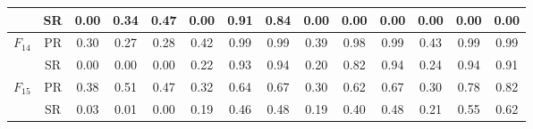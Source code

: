 \begin{table*}[h]
\begin{tabular}{|c|c|ccc|ccc|ccc|ccc|}
    & SR & 0.00 & 0.34 & 0.47 & 0.00 & 0.91 & 0.84 & 0.00 & 0.00 & 0.00 & 0.00 & 0.00 & 0.00 \\
    \hline
    \multirow{2}{*}{$F_{14}$} & PR & 0.30 & 0.27 & 0.28 & 0.42 & 0.99 & 0.99 & 0.39 & 0.98 & 0.99 & 0.43 & 0.99 & 0.99 \\
    & SR & 0.00 & 0.00 & 0.00 & 0.22 & 0.93 & 0.94 & 0.20 & 0.82 & 0.94 & 0.24 & 0.94 & 0.91 \\
    \hline
    \multirow{2}{*}{$F_{15}$} & PR & 0.38 & 0.51 & 0.47 & 0.32 & 0.64 & 0.67 & 0.30 & 0.62 & 0.67 & 0.30 & 0.78 & 0.82 \\
    & SR & 0.03 & 0.01 & 0.00 & 0.19 & 0.46 & 0.48 & 0.19 & 0.40 & 0.48 & 0.21 & 0.55 & 0.62 \\
    \hline
  \end{tabular}
\end{table*}